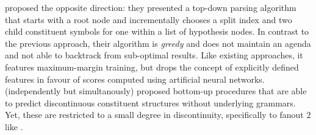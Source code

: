 \documentclass[../document.tex]{subfiles}
\begin{document}
    \citet{Stern17} proposed the opposite direction: they presented a top-down parsing algorithm that starts with a root node and incrementally chooses a split index and two child constituent symbols for one within a list of hypothesis nodes.
    In contrast to the previous approach, their algorithm is \emph{greedy} and does not maintain an agenda and not able to backtrack from sub-optimal results.
    Like existing approaches, it features maximum-margin training, but drops the concept of explicitly defined features in favour of scores computed using artificial neural networks.
    \citet{Cor20,StaSte20} (independently but simultanously) proposed bottom-up procedures that are able to predict discontinuous constituent structures without underlying grammars.
    Yet, these are restricted to a small degree in discontinuity, specifically to fanout 2 like .
\end{document}
